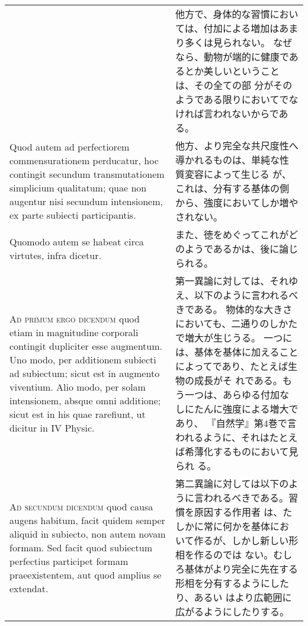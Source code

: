 \documentclass[10pt]{jsarticle} %
\begin{document}
\begin{longtable}{p{21em}p{21em}}
&

他方で、身体的な習慣においては、付加による増加はあまり多くは見られない。
 なぜなら、動物が端的に健康であるとか美しいということは、その全ての部
 分がそのようである限りにおいてでなければ言われないからである。

\\


Quod autem ad perfectiorem commensurationem perducatur, hoc
contingit secundum transmutationem simplicium qualitatum; quae non
augentur nisi secundum intensionem, ex parte subiecti
participantis. 


&

他方、より完全な共尺度性へ導かれるものは、単純な性質変容によって生じる
 が、これは、分有する基体の側から、強度においてしか増やされない。


\\

Quomodo autem se habeat circa virtutes, infra dicetur.

&

また、徳をめぐってこれがどのようであるかは、後に論じられる。

\\



{\scshape Ad primum ergo dicendum} quod etiam in magnitudine corporali contingit
dupliciter esse augmentum. Uno modo, per additionem subiecti ad
subiectum; sicut est in augmento viventium. Alio modo, per solam
intensionem, absque omni additione; sicut est in his quae rarefiunt,
ut dicitur in IV Physic.


&

第一異論に対しては、それゆえ、以下のように言われるべきである。
物体的な大きさにおいても、二通りのしかたで増大が生じうる。
一つには、基体を基体に加えることによってであり、たとえば生物の成長がそ
れである。もう一つは、あらゆる付加なしにたんに強度による増大であり、
『自然学』第4巻で言われるように、それはたとえば希薄化するものにおいて見られ
る。


\\



{\scshape Ad secundum dicendum} quod causa augens habitum, facit quidem semper
aliquid in subiecto, non autem novam formam. Sed facit quod subiectum
perfectius participet formam praeexistentem, aut quod amplius se
extendat.


&

第二異論に対しては以下のように言われるべきである。習慣を原因する作用者
は、たしかに常に何かを基体において作るが、しかし新しい形相を作るのでは
ない。むしろ基体がより完全に先在する形相を分有するようにしたり、あるい
はより広範囲に広がるようにしたりする。


\end{longtable}
\end{document}
